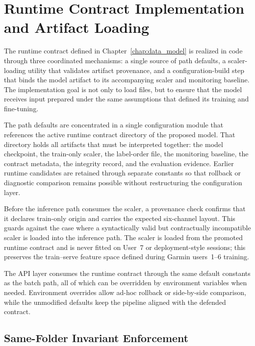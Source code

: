 \section{Runtime Contract Implementation and Artifact Loading}
\label{sec:contract_loading}

The runtime contract defined in Chapter~\ref{chap:data_model} is realized in code through three coordinated mechanisms: a single source of path defaults, a scaler-loading utility that validates artifact provenance, and a configuration-build step that binds the model artifact to its accompanying scaler and monitoring baseline. The implementation goal is not only to load files, but to ensure that the model receives input prepared under the same assumptions that defined its training and fine-tuning.

The path defaults are concentrated in a single configuration module that references the active runtime contract directory of the proposed model. That directory holds all artifacts that must be interpreted together: the model checkpoint, the train-only scaler, the label-order file, the monitoring baseline, the contract metadata, the integrity record, and the evaluation evidence. Earlier runtime candidates are retained through separate constants so that rollback or diagnostic comparison remains possible without restructuring the configuration layer.

Before the inference path consumes the scaler, a provenance check confirms that it declares train-only origin and carries the expected six-channel layout. This guards against the case where a syntactically valid but contractually incompatible scaler is loaded into the inference path. The scaler is loaded from the promoted runtime contract and is never fitted on User~7 or deployment-style sessions; this preserves the train--serve feature space defined during Garmin users~1--6 training.

The API layer consumes the runtime contract through the same default constants as the batch path, all of which can be overridden by environment variables when needed. Environment overrides allow ad-hoc rollback or side-by-side comparison, while the unmodified defaults keep the pipeline aligned with the defended contract.

\subsection{Same-Folder Invariant Enforcement}
\label{sec:contract_invariant}

